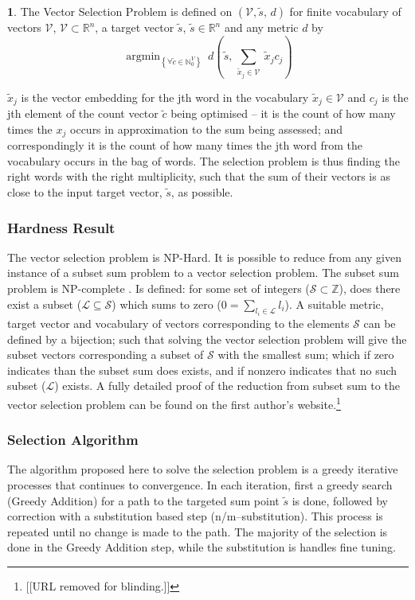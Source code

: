 \documentclass[11pt]{article}
\theoremstyle{plain}
\theoremstyle{definition}
\newtheorem{defn}[thm]{\protect\definitionname}
\providecommand{\definitionname}{Definition}
\DeclareMathOperator*{\argmin}{argmin}
\begin{document}
\renewcommand{\c}{\tilde{c}}
\newcommand{\s}{\tilde{s}}
\newcommand{\x}{\tilde{x}}
\renewcommand{\t}{\tilde{t}}
\newcommand{\N}{\mathbb{N}}
\newcommand{\R}{\mathbb{R}}
\newcommand{\V}{\mathcal{V}}

\begin{defn}{The Vector Selection Problem}
	is defined on $(\V, \s,\,d)$ for finite vocabulary of vectors $\V$, $\V\subset{\R}^{n}$, a target vector $ \s$, $ \s\in\R^{n}$ and any metric $d$ by
		\[
		\argmin_{\left\{ \forall\c\in\N_{0}^{V}\right\} }\:d( \s,\,\sum_{\x_j\in\V}\:\x_{j}c_{j})
		\]
						
		$\x_{j}$ is the vector embedding for the jth word in the vocabulary
		$\x_{j}\in\V$ and $c_j$ is the jth element of the count vector $\c$ being optimised -- it is the count of how many times the $x_j$ occurs in approximation to the sum being assessed; and correspondingly it is the count of how many times the jth word from the vocabulary occurs in the bag of words.
		The selection problem is thus finding the right words with the right multiplicity, such that the sum of their vectors is as close to the input target vector, $\s$, as possible.
\end{defn}

\subsubsection{Hardness Result}
The vector selection problem is NP-Hard. It is possible to reduce from any given instance of a subset sum problem to a vector selection problem. The subset sum problem is NP-complete \textcite{karp1972reducibility}. Is defined: for some set of integers ($\mathcal{S}\subset\mathbb{Z}$), does there exist a subset ($\mathcal{L}\subseteq\mathcal{S}$) which sums to zero ($0=\sum_{l_i\in \mathcal{L}} l_i$).  A suitable metric, target vector and  vocabulary of vectors corresponding to the elements $\mathcal{S}$ can be defined by a bijection; such that solving the vector selection problem will give the subset vectors corresponding a subset of $\mathcal{S}$ with the smallest sum; which if zero indicates than the subset sum does exists, and if nonzero indicates that no such subset ($\mathcal{L}$) exists. A fully detailed proof of the reduction from subset sum to the vector selection problem can be found on the first author's website.\footnote{[[URL removed for blinding.]]}

\subsubsection{Selection Algorithm}
The algorithm proposed here to solve the selection problem is a greedy iterative processes that continues to convergence. In each iteration, first a greedy search (Greedy Addition) for a path to the targeted sum point $\s$ is done, followed by correction with a substitution based step (n/m--substitution). This process is repeated until no change is made to the path. The majority of the selection is done in the Greedy Addition step, while the substitution is handles fine tuning.
\end{document}
